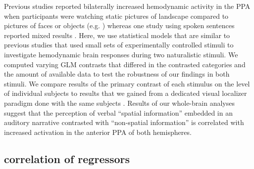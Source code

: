 \documentclass[english]{article}
\begin{document}




Previous studies reported bilaterally increased hemodynamic activity in the PPA
when participants were watching static pictures of landscape compared to
pictures of faces or objects (e.g. \citep{epstein1998ppa,
epstein1999parahippocampal}) whereas one study using spoken sentences reported
mixed results \citep{aziz2008modulation}.
Here, we use statistical models that are similar to previous studies that used
small sets of experimentally controlled stimuli to investigate hemodynamic brain
responses during two naturalistic stimuli.
We computed varying GLM contrasts that differed in the contrasted categories and
the amount of available data to test the robustness of our findings in both
stimuli.
We compare results of the primary contrast of each stimulus on the level of
individual subjects to results that we gained from a dedicated visual localizer
paradigm done with the same subjects \citep{sengupta2016extension}.
Results of our whole-brain analyses suggest that the perception of verbal
``spatial information'' embedded in an auditory narrative contrasted with
``non-spatial information'' is correlated with increased activation in the
anterior PPA of both hemispheres.

\subsection{correlation of regressors}
\end{document}
